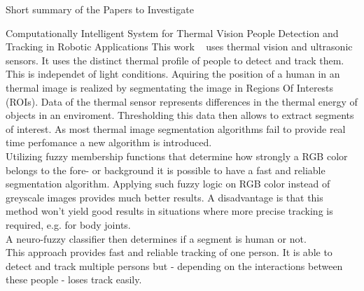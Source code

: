 \documentclass[a4paper,oneside,10pt,DIV12,headsepline,footexclude,headexclude]{scrartcl}
\begin{document}
\begin{section}{Short summary of the Papers to Investigate}
\begin{subsection}{Computationally Intelligent System for Thermal Vision People
Detection and Tracking in Robotic Applications}
This work ~\cite{ciric2013computationally} uses thermal vision and ultrasonic
sensors. 
It uses the distinct thermal profile of people to detect and track them. This is
independet of light conditions.
Aquiring the position of a human in an thermal image is realized by segmentating
the image in Regions Of Interests (ROIs). Data of the thermal sensor 
represents differences in the thermal energy of objects in an enviroment.
Thresholding this data then allows to extract segments of interest. 
As most thermal image segmentation algorithms fail to provide real time perfomance
a new algorithm is introduced.\\
Utilizing fuzzy membership functions that determine how strongly a RGB color 
belongs to the fore- or background it is possible to have a fast and reliable
segmentation algorithm. Applying such fuzzy logic on RGB color instead of greyscale
images provides much better results. A disadvantage is that this method won't yield
good results in situations where more precise tracking is required, e.g. 
for body joints.\\
A neuro-fuzzy classifier then determines if a segment is human or not.\\
This approach provides fast and reliable tracking of one person.
It is able to detect and track multiple persons but - depending on the interactions
between these people - loses track easily.


\end{subsection}


\begin{subsection}{4}
\end{subsection}

\begin{subsection}{5}
\end{subsection}

\end{section}




\end{document}
